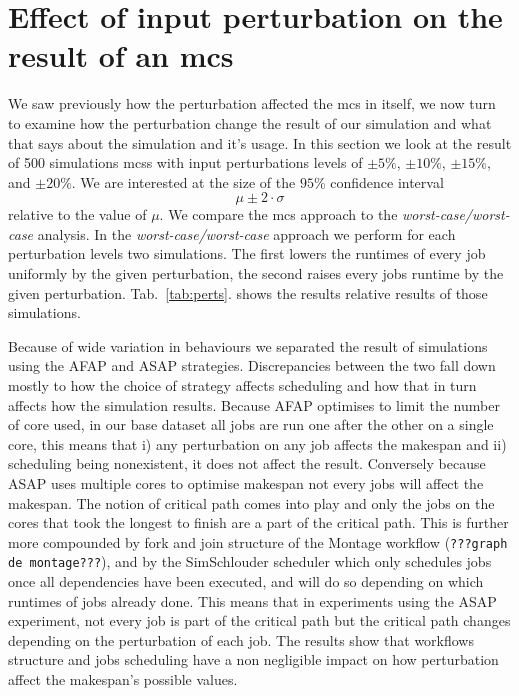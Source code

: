 \documentclass[10pt,conference,compsocconf]{IEEEtran}
\newcommand{\pmpc}[1]{$\pm#1\%$}
\begin{document}
\section{Effect of input perturbation on the result of an \ac{mcs}}

We saw previously how the perturbation affected the \acl{mcs} in itself, we now
turn to examine how the perturbation change the result of our simulation and
what that says about the simulation and it's usage. In this section we look at
the result of 500 simulations \acp{mcs} with input perturbations levels of
\pmpc{5}, \pmpc{10}, \pmpc{15}, and \pmpc{20}. We are interested at the size of
the $95\%$ confidence interval \[\mu\pm2\cdot\sigma\] relative to the value of
$\mu$. We compare the \ac{mcs} approach to the \emph{worst-case/worst-case}
analysis. In the \emph{worst-case/worst-case} approach we perform for each 
perturbation levels two simulations. The first lowers the runtimes of every job
uniformly by the given perturbation, the second raises every jobs runtime by the
given perturbation. Tab.~\ref{tab:perts}. shows the results relative results of
those simulations.

Because of wide variation in behaviours we separated the result of simulations
using the AFAP and ASAP strategies. Discrepancies between the two fall down
mostly to how the choice of strategy affects scheduling and how that in turn
affects how the simulation results. Because AFAP optimises to limit the number
of core used, in our base dataset all jobs are run one after the other on a
single core, this means that i) any perturbation on any job affects the
makespan and ii) scheduling being nonexistent, it does not affect the result.
Conversely because ASAP uses multiple cores to optimise makespan not every jobs
will affect the makespan. The notion of critical path comes into play and only
the jobs on the cores that took the longest to finish are a part of the critical
path. This is further more compounded by fork and join structure of the Montage
workflow (\texttt{???graph de montage???}), and by the SimSchlouder scheduler
which only schedules jobs once all dependencies have been executed, and will do
so depending on which runtimes of jobs already done. This means that in
experiments using the ASAP experiment, not every job is part of the critical
path but the critical path changes depending on the perturbation of each job.
The results show that workflows structure and jobs scheduling have a non
negligible impact on how perturbation affect the makespan's possible values.
\end{document}
